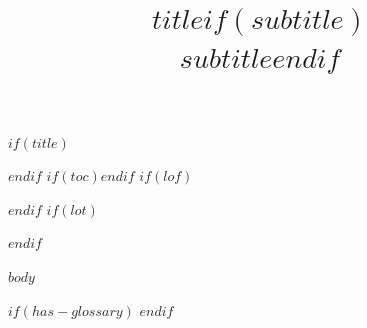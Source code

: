 \documentclass[10pt,twoside,twocolumn]{article}
\title{$title$$if(subtitle)$\\[0.4em]\large $subtitle$$endif$}
\theoremstyle{plain}
\theoremstyle{definition}
\theoremstyle{remark}
\begin{document}
$if(title)$\maketitle$endif$
$if(toc)$\tableofcontents\newpage$endif$
$if(lof)$\listoffigures$endif$
$if(lot)$\listoftables$endif$

$body$

$if(has-glossary)$
\clearpage
\printglossary[type=\acronymtype, title={Acronyms}]
\printglossary[title={Glossary}]
$endif$
\end{document}

